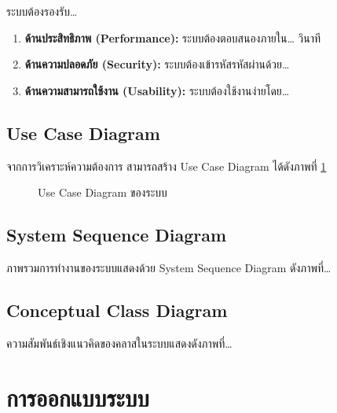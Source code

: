 ระบบต้องรองรับ\ldots{}

\begin{enumerate}[label=\arabic*)]
    \item \textbf{ด้านประสิทธิภาพ (Performance):} ระบบต้องตอบสนองภายใน\ldots{} วินาที
    \item \textbf{ด้านความปลอดภัย (Security):} ระบบต้องเข้ารหัสรหัสผ่านด้วย\ldots{}
    \item \textbf{ด้านความสามารถใช้งาน (Usability):} ระบบต้องใช้งานง่ายโดย\ldots{}
\end{enumerate}

\subsection{Use Case Diagram}

จากการวิเคราะห์ความต้องการ สามารถสร้าง Use Case Diagram ได้ดังภาพที่ \ref{fig:usecase}

\begin{figure}[H]
\centering
\caption{Use Case Diagram ของระบบ}
\label{fig:usecase}
\end{figure}

\subsection{System Sequence Diagram}

ภาพรวมการทำงานของระบบแสดงด้วย System Sequence Diagram ดังภาพที่\ldots{}

\subsection{Conceptual Class Diagram}

ความสัมพันธ์เชิงแนวคิดของคลาสในระบบแสดงดังภาพที่\ldots{}

\section{การออกแบบระบบ}

